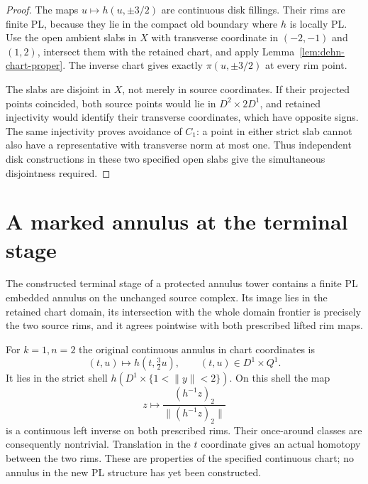 \begin{proof}
The maps $u\mapsto h(u,\pm3/2)$ are continuous disk fillings.  Their
rims are finite PL, because they lie in the compact old boundary
where $h$ is locally PL.  Use the open ambient slabs in $X$ with
transverse coordinate in $(-2,-1)$ and $(1,2)$, intersect them with
the retained chart, and apply Lemma~\ref{lem:dehn-chart-proper}.
The inverse chart gives exactly $\pi(u,\pm3/2)$ at every rim point.

The slabs are disjoint in $X$, not merely in source coordinates.
If their projected points coincided, both source points would lie
in $D^2\times2D^1$, and retained injectivity would identify their
transverse coordinates, which have opposite signs.  The same
injectivity proves avoidance of $C_1$: a point in either strict slab
cannot also have a representative with transverse norm at most one.
Thus independent disk constructions in these two specified open
slabs give the simultaneous disjointness required.
\end{proof}

\section{A marked annulus at the terminal stage}
\label{sec:dehn-terminal-annulus}

\begin{theorem}
\label{thm:dehn-terminal-annulus}
The constructed terminal stage of a protected annulus tower contains
a finite PL embedded annulus on the unchanged source complex. Its
image lies in the retained chart domain, its intersection with the
whole domain frontier is precisely the two source rims, and it agrees
pointwise with both prescribed lifted rim maps.
\end{theorem}

For $k=1,n=2$ the original continuous annulus in chart coordinates is
\[
       (t,u)\longmapsto h(t,\tfrac32u),
       \qquad (t,u)\in D^1\times Q^1.
\]
It lies in the strict shell $h(D^1\times\{1<\|y\|<2\})$.
On this shell the map
\[
             z\longmapsto
             \frac{(h^{-1}z)_2}{\|(h^{-1}z)_2\|}
\]
is a continuous left inverse on both prescribed rims.
Their once-around classes are consequently nontrivial.  Translation
in the $t$ coordinate gives an actual homotopy between the two rims.
These are properties of the specified continuous chart; no annulus
in the new PL structure has yet been constructed.

